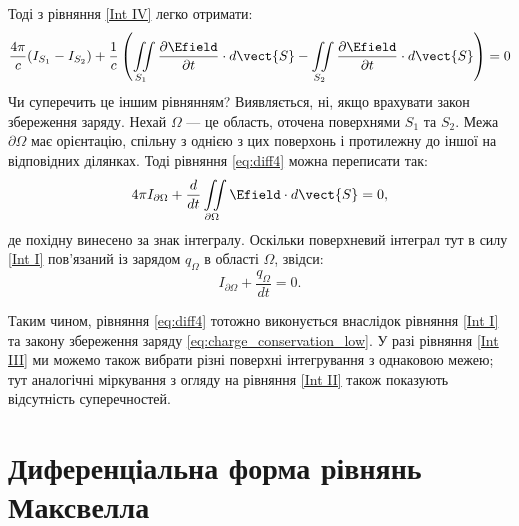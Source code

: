 Тоді з рівняння \eqref{Int IV} легко отримати:
\begin{equation}\label{eq:diff4}
    \frac{4\pi}c(I_{S_1} - I_{S_2}) +\frac1c \left( \iint\limits_{S_1}
	\frac{\partial\Efield}{\partial t}\cdot d\vect{S}  - \iint\limits_{S_2}
	\frac{\partial\Efield}{\partial t}\cdot d\vect{S}  \right) = 0
\end{equation}
Чи суперечить це іншим рівнянням? Виявляється, ні, якщо врахувати закон збереження заряду. Нехай $\Omega$ --- це область, оточена поверхнями $S_1$ та
$S_2$. Межа $\partial\Omega$ має орієнтацію, спільну з однією з цих поверхонь і протилежну до іншої на відповідних ділянках. Тоді рівняння
\eqref{eq:diff4} можна переписати так:
\begin{equation}
    4\pi I_{\partial\Omega} + \frac{d}{dt} \iint\limits_{\partial\Omega} \Efield\cdot d\vect{S} = 0,
\end{equation}
де похідну винесено за знак інтегралу. Оскільки поверхневий інтеграл тут в силу \eqref{Int I} пов’язаний із зарядом $q_{\Omega}$ в області $\Omega$,
звідси:
\begin{equation}\label{eq:charge_conservation_low}
    I_{\partial\Omega} + \frac{q_{\Omega}}{dt} = 0.
\end{equation}

Таким чином, рівняння \eqref{eq:diff4} тотожно виконується внаслідок рівняння
\eqref{Int I} та закону збереження заряду \eqref{eq:charge_conservation_low}.
У разі рівняння \eqref{Int III} ми можемо також вибрати різні поверхні
інтегрування з однаковою межею; тут аналогічні міркування з огляду на
рівняння \eqref{Int II} також показують відсутність суперечностей.


\section{Диференціальна форма рівнянь Максвелла}


